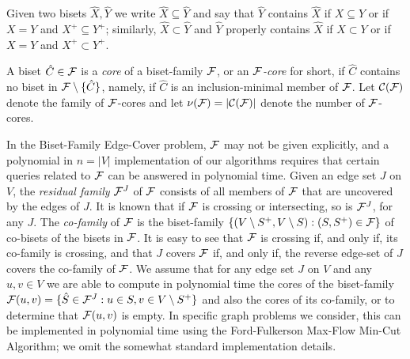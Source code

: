 \vspace{0.1cm}

Given two bisets $\hat{X},\hat{Y}$ we write $\hat{X} \subseteq \hat{Y}$ and 
say that $\hat{Y}$ contains $\hat{X}$ if $X \subseteq Y$
or if $X=Y$ and $X^+ \subseteq Y^+$; similarly, $\hat{X} \subset \hat{Y}$ and $\hat{Y}$ 
properly contains $\hat{X}$ if $X \subset Y$ or if $X=Y$ and $X^+ \subset Y^+$.

\begin{definition}
A biset $\hat{C} \in {\cal F}$ is a {\em core} of a biset-family ${\cal F}$,
or an {\em ${\cal F}$-core} for short, 
if $\hat{C}$ contains no biset in ${\cal F} \setminus \{\hat{C}\}$, namely,
if $\hat{C}$ is an inclusion-minimal member of ${\cal F}$.
Let ${\cal C}({\cal F})$ denote the family of ${\cal F}$-cores and let 
$\nu({\cal F})=|{\cal C}({\cal F})|$ denote the number of ${\cal F}$-cores.
\end{definition}

In the {\sf Biset-Family Edge-Cover} problem, ${\cal F}$ may not be given explicitly,
and a polynomial in $n=|V|$ implementation of our algorithms requires that certain queries related 
to ${\cal F}$ can be answered in polynomial time.
Given an edge set $J$ on $V$, the {\em residual family} ${\cal F}^J$
of ${\cal F}$ consists of all members of ${\cal F}$ that are uncovered by the edges of $J$.
It is known that if ${\cal F}$ is crossing or intersecting, so is ${\cal F}^J$, for any $J$.
The {\em co-family} of ${\cal F}$ is the biset-family 
$\{(V \setminus S^+, V\setminus S):(S,S^+) \in {\cal F}\}$ of co-bisets of the bisets in ${\cal F}$.
It is easy to see that ${\cal F}$ is crossing if, and only if, its co-family is crossing,
and that $J$ covers ${\cal F}$ if, and only if, the reverse edge-set of $J$ covers the co-family 
of ${\cal F}$. We assume that for any edge set $J$ on $V$ and any $u,v \in V$ we are able to compute 
in polynomial time the cores of the biset-family 
${\cal F}(u,v)=\{\hat{S} \in {\cal F}^J: u \in S, v \in V \setminus S^+\}$ 
and also the cores of its co-family, or to determine that ${\cal F}(u,v)$ is empty.
In specific graph problems we consider, this can be implemented in polynomial time using the 
Ford-Fulkerson Max-Flow Min-Cut Algorithm; we omit the somewhat standard implementation details.


